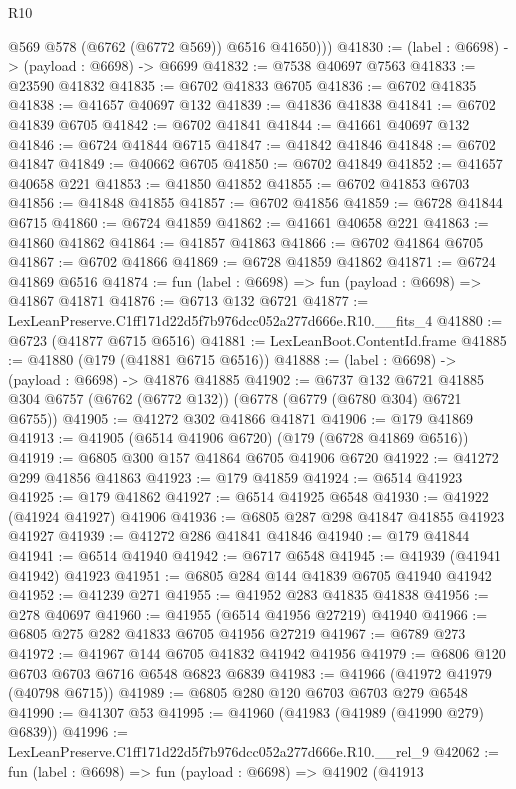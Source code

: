 \begin{lexlean}{R10}
\begin{coremodule}
          @569
          @578
          (@6762 (@6772 @569))
          @6516
          @41650)))
@41830 := (label : @6698) -> (payload : @6698) -> @6699
@41832 := @7538 @40697 @7563
@41833 := @23590 @41832
@41835 := @6702 @41833 @6705
@41836 := @6702 @41835
@41838 := @41657 @40697 @132
@41839 := @41836 @41838
@41841 := @6702 @41839 @6705
@41842 := @6702 @41841
@41844 := @41661 @40697 @132
@41846 := @6724 @41844 @6715
@41847 := @41842 @41846
@41848 := @6702 @41847
@41849 := @40662 @6705
@41850 := @6702 @41849
@41852 := @41657 @40658 @221
@41853 := @41850 @41852
@41855 := @6702 @41853 @6703
@41856 := @41848 @41855
@41857 := @6702 @41856
@41859 := @6728 @41844 @6715
@41860 := @6724 @41859
@41862 := @41661 @40658 @221
@41863 := @41860 @41862
@41864 := @41857 @41863
@41866 := @6702 @41864 @6705
@41867 := @6702 @41866
@41869 := @6728 @41859 @41862
@41871 := @6724 @41869 @6516
@41874 := fun (label : @6698) => fun (payload : @6698) => @41867 @41871
@41876 := @6713 @132 @6721
@41877 := LexLeanPreserve.C1ff171d22d5f7b976dcc052a277d666e.R10.__fits_4
@41880 := @6723 (@41877 @6715 @6516)
@41881 := LexLeanBoot.ContentId.frame
@41885 := @41880 (@179 (@41881 @6715 @6516))
@41888 := (label : @6698) -> (payload : @6698) -> @41876 @41885
@41902 := @6737
    @132
    @6721
    @41885
    @304
    @6757
    (@6762 (@6772 @132))
    (@6778 (@6779 (@6780 @304) @6721 @6755))
@41905 := @41272 @302 @41866 @41871
@41906 := @179 @41869
@41913 := @41905 (@6514 @41906 @6720) (@179 (@6728 @41869 @6516))
@41919 := @6805 @300 @157 @41864 @6705 @41906 @6720
@41922 := @41272 @299 @41856 @41863
@41923 := @179 @41859
@41924 := @6514 @41923
@41925 := @179 @41862
@41927 := @6514 @41925 @6548
@41930 := @41922 (@41924 @41927) @41906
@41936 := @6805 @287 @298 @41847 @41855 @41923 @41927
@41939 := @41272 @286 @41841 @41846
@41940 := @179 @41844
@41941 := @6514 @41940
@41942 := @6717 @6548
@41945 := @41939 (@41941 @41942) @41923
@41951 := @6805 @284 @144 @41839 @6705 @41940 @41942
@41952 := @41239 @271
@41955 := @41952 @283 @41835 @41838
@41956 := @278 @40697
@41960 := @41955 (@6514 @41956 @27219) @41940
@41966 := @6805 @275 @282 @41833 @6705 @41956 @27219
@41967 := @6789 @273
@41972 := @41967 @144 @6705 @41832 @41942 @41956
@41979 := @6806 @120 @6703 @6703 @6716 @6548 @6823 @6839
@41983 := @41966 (@41972 @41979 (@40798 @6715))
@41989 := @6805 @280 @120 @6703 @6703 @279 @6548
@41990 := @41307 @53
@41995 := @41960 (@41983 (@41989 (@41990 @279) @6839))
@41996 := LexLeanPreserve.C1ff171d22d5f7b976dcc052a277d666e.R10.__rel_9
@42062 := fun (label : @6698) =>
  fun (payload : @6698) =>
  @41902
    (@41913

\end{coremodule}
\end{lexlean}
